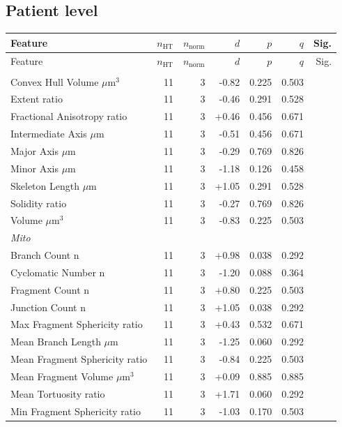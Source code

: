 \documentclass[11pt,a4paper]{article}
\begin{document}
\subsection*{Patient level}
\begin{longtable}{lrrrrrr}
\toprule
Feature & $n_\text{HT}$ & $n_\text{norm}$ & $d$ & $p$ & $q$ & Sig. \\
\midrule\endfirsthead
\toprule Feature & $n_\text{HT}$ & $n_\text{norm}$ & $d$ & $p$ & $q$ & Sig. \\\midrule\endhead
\bottomrule\endfoot
\multicolumn{7}{l}{\textit{Actin}} \\
  Convex Hull Volume $\mu$m$^{3}$ & 11 & 3 & -0.82 & 0.225 & 0.503 &  \\
  Extent ratio & 11 & 3 & -0.46 & 0.291 & 0.528 &  \\
  Fractional Anisotropy ratio & 11 & 3 & +0.46 & 0.456 & 0.671 &  \\
  Intermediate Axis $\mu$m & 11 & 3 & -0.51 & 0.456 & 0.671 &  \\
  Major Axis $\mu$m & 11 & 3 & -0.29 & 0.769 & 0.826 &  \\
  Minor Axis $\mu$m & 11 & 3 & -1.18 & 0.126 & 0.458 &  \\
  Skeleton Length $\mu$m & 11 & 3 & +1.05 & 0.291 & 0.528 &  \\
  Solidity ratio & 11 & 3 & -0.27 & 0.769 & 0.826 &  \\
  Volume $\mu$m$^{3}$ & 11 & 3 & -0.83 & 0.225 & 0.503 &  \\
\midrule
\multicolumn{7}{l}{\textit{Mito}} \\
  Branch Count n & 11 & 3 & +0.98 & 0.038 & 0.292 &  \\
  Cyclomatic Number n & 11 & 3 & -1.20 & 0.088 & 0.364 &  \\
  Fragment Count n & 11 & 3 & +0.80 & 0.225 & 0.503 &  \\
  Junction Count n & 11 & 3 & +1.05 & 0.038 & 0.292 &  \\
  Max Fragment Sphericity ratio & 11 & 3 & +0.43 & 0.532 & 0.671 &  \\
  Mean Branch Length $\mu$m & 11 & 3 & -1.25 & 0.060 & 0.292 &  \\
  Mean Fragment Sphericity ratio & 11 & 3 & -0.84 & 0.225 & 0.503 &  \\
  Mean Fragment Volume $\mu$m$^{3}$ & 11 & 3 & +0.09 & 0.885 & 0.885 &  \\
  Mean Tortuosity ratio & 11 & 3 & +1.71 & 0.060 & 0.292 &  \\
  Min Fragment Sphericity ratio & 11 & 3 & -1.03 & 0.170 & 0.503 &  \\

\end{longtable}
\end{document}
